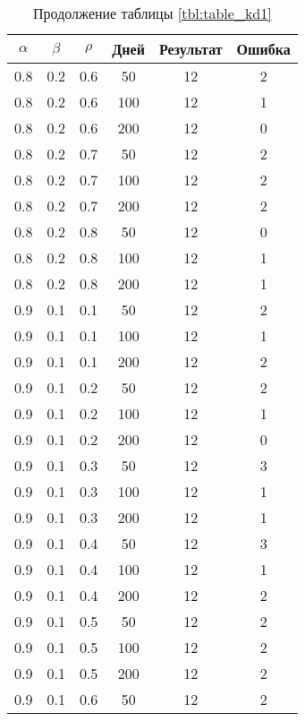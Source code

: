 \begin{table}[h]
	\begin{center}
        \captionsetup{justification=raggedright,singlelinecheck=off}
		\caption*{Продолжение таблицы \ref{tbl:table_kd1}}
		\begin{tabular}{|c|c|c|c|c|c|}
  	\hline
	$\alpha$ & $\beta$ & $\rho$ & Дней & Результат & Ошибка \\\hline
 
	0.8 &  0.2 &  0.6 &   50 &    12 &     2 \\
	0.8 &  0.2 &  0.6 &  100 &    12 &     1 \\
	0.8 &  0.2 &  0.6 &  200 &    12 &     0 \\
   \hline
	0.8 &  0.2 &  0.7 &   50 &    12 &     2 \\
	0.8 &  0.2 &  0.7 &  100 &    12 &     2 \\
	0.8 &  0.2 &  0.7 &  200 &    12 &     2 \\
   \hline
	0.8 &  0.2 &  0.8 &   50 &    12 &     0 \\
	0.8 &  0.2 &  0.8 &  100 &    12 &     1 \\
	0.8 &  0.2 &  0.8 &  200 &    12 &     1 \\
   \hline
	0.9 &  0.1 &  0.1 &   50 &    12 &     2 \\
	0.9 &  0.1 &  0.1 &  100 &    12 &     1 \\
	0.9 &  0.1 &  0.1 &  200 &    12 &     2 \\
   \hline
	0.9 &  0.1 &  0.2 &   50 &    12 &     2 \\
	0.9 &  0.1 &  0.2 &  100 &    12 &     1 \\
	0.9 &  0.1 &  0.2 &  200 &    12 &     0 \\
   \hline
	0.9 &  0.1 &  0.3 &   50 &    12 &     3 \\
	0.9 &  0.1 &  0.3 &  100 &    12 &     1 \\
	0.9 &  0.1 &  0.3 &  200 &    12 &     1 \\
   \hline
	0.9 &  0.1 &  0.4 &   50 &    12 &     3 \\
	0.9 &  0.1 &  0.4 &  100 &    12 &     1 \\
	0.9 &  0.1 &  0.4 &  200 &    12 &     2 \\
   \hline
	0.9 &  0.1 &  0.5 &   50 &    12 &     2 \\
	0.9 &  0.1 &  0.5 &  100 &    12 &     2 \\
	0.9 &  0.1 &  0.5 &  200 &    12 &     2 \\
   \hline
	0.9 &  0.1 &  0.6 &   50 &    12 &     2 \\

\end{tabular}
\end{center}
\end{table}

